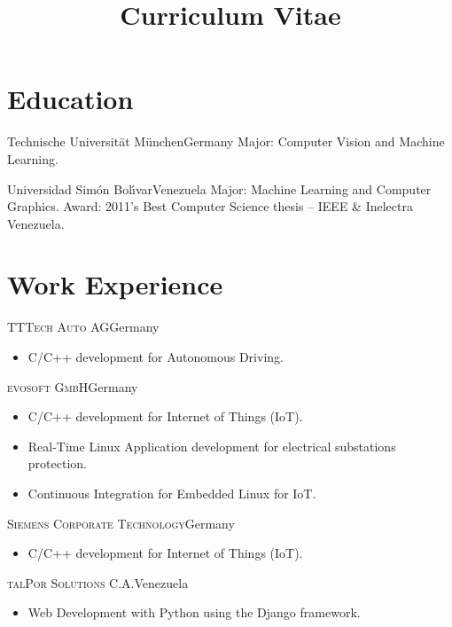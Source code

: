 \documentclass[10pt]{moderncv}
\title{Curriculum Vitae}
\begin{document}
\maketitle

\section{Education}

  {Technische Universit\"at M\"unchen}{Germany}{}{%
    Major: Computer Vision and Machine Learning.
  }

  {Universidad Sim\'on Bol\'{\i}var}{Venezuela}{}{%
    Major: Machine Learning and Computer Graphics.
    \newline
    Award: 2011's Best Computer Science thesis -- IEEE \& Inelectra Venezuela.
  }

\section{Work Experience}

{\textsc{TTTech Auto AG}}{Germany}{}{%
\begin{itemize}
    \item C/C++ development for Autonomous Driving.
\end{itemize}
}

{\textsc{evosoft GmbH}}{Germany}{}{%
\begin{itemize}
    \item C/C++ development for Internet of Things (IoT).
    \item Real-Time Linux Application development for electrical substations protection.
    \item Continuous Integration for Embedded Linux for IoT.
\end{itemize}
}

{\textsc{Siemens Corporate Technology}}{Germany}{}{%
\begin{itemize}
  \item C/C++ development for Internet of Things (IoT).
\end{itemize}
}

{\textsc{talPor Solutions C.A.}}{Venezuela}{}{%
\begin{itemize}
  \item Web Development with Python using the Django framework.
\end{itemize}
}
\end{document}
